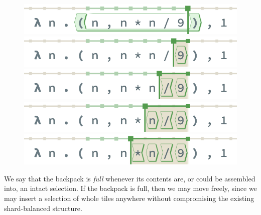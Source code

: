 \begin{figure}[h]
  \includegraphics[width=0.65\columnwidth]{img/selection-whole-0.png}
  \includegraphics[width=0.65\columnwidth]{img/selection-whole-1.png}
  \includegraphics[width=0.65\columnwidth]{img/selection-whole-2.png}
  \includegraphics[width=0.65\columnwidth]{img/selection-whole-3.png}
  \includegraphics[width=0.65\columnwidth]{img/selection-whole-4.png}
\end{figure}



We say that the backpack is \emph{full} whenever
its contents are, or could be assembled into, an intact selection.
If the backpack is full, then we may move freely,
since we may insert a selection of whole tiles anywhere
without compromising the existing shard-balanced structure.

